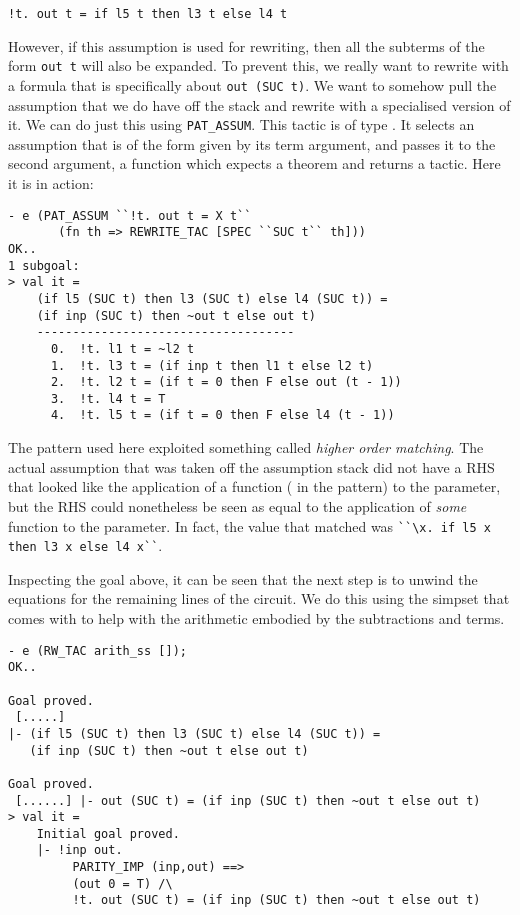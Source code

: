 {\small\verb|!t. out t = if l5 t then l3 t else l4 t|}

\medskip However, if this assumption is used for rewriting, then all
the subterms of the form {\small\verb|out t|} will also be expanded.
To prevent this, we really want to rewrite with a formula that is
specifically about {\small\verb|out (SUC t)|}.  We want to somehow
pull the assumption that we do have off the stack and rewrite with a
specialised version of it.  We can do just this using
{\small\verb|PAT_ASSUM|}.  This tactic is of type .  It selects an assumption that is of the form given by
  its term argument, and passes it to the second argument, a function
  which expects a theorem and returns a tactic.  Here it is in action:

\begin{session}
\begin{verbatim}
- e (PAT_ASSUM ``!t. out t = X t``
       (fn th => REWRITE_TAC [SPEC ``SUC t`` th]))
OK..
1 subgoal:
> val it =
    (if l5 (SUC t) then l3 (SUC t) else l4 (SUC t)) =
    (if inp (SUC t) then ~out t else out t)
    ------------------------------------
      0.  !t. l1 t = ~l2 t
      1.  !t. l3 t = (if inp t then l1 t else l2 t)
      2.  !t. l2 t = (if t = 0 then F else out (t - 1))
      3.  !t. l4 t = T
      4.  !t. l5 t = (if t = 0 then F else l4 (t - 1))
\end{verbatim}
\end{session}
The pattern used here exploited something called \emph{higher order
  matching}. The actual assumption that was taken off the assumption
stack did not have a RHS that looked like the application of a
function ( in the pattern) to the  parameter, but the RHS
could nonetheless be seen as equal to the application of \emph{some}
function to the  parameter.  In fact, the value that matched
   was {\small\verb|``\x. if l5 x then l3 x else l4 x``|}.

  Inspecting the goal above, it can be seen that the next step is to
  unwind the equations for the remaining lines of the circuit.  We do
  this using the  simpset that comes with 
  to help with the arithmetic embodied by the subtractions and
   terms.

\begin{session}
\begin{verbatim}
- e (RW_TAC arith_ss []);
OK..

Goal proved.
 [.....]
|- (if l5 (SUC t) then l3 (SUC t) else l4 (SUC t)) =
   (if inp (SUC t) then ~out t else out t)

Goal proved.
 [......] |- out (SUC t) = (if inp (SUC t) then ~out t else out t)
> val it =
    Initial goal proved.
    |- !inp out.
         PARITY_IMP (inp,out) ==>
         (out 0 = T) /\
         !t. out (SUC t) = (if inp (SUC t) then ~out t else out t)
\end{verbatim}
\end{session}

